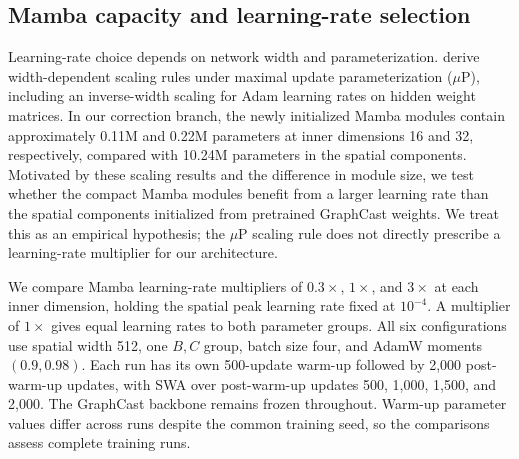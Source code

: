 \documentclass{article}
\begin{document}
\subsection{\texorpdfstring{{Mamba capacity and learning-rate selection}}{Mamba capacity and learning-rate selection}}
\label{sec:training_sensitivity}

{Learning-rate choice depends on network width and parameterization. \citet{yang2022tensorprogramsv} derive width-dependent scaling rules under maximal update parameterization ($\mu$P), including an inverse-width scaling for Adam learning rates on hidden weight matrices. In our correction branch, the newly initialized Mamba modules contain approximately 0.11M and 0.22M parameters at inner dimensions 16 and 32, respectively, compared with 10.24M parameters in the spatial components. Motivated by these scaling results and the difference in module size, we test whether the compact Mamba modules benefit from a larger learning rate than the spatial components initialized from pretrained GraphCast weights. We treat this as an empirical hypothesis; the $\mu$P scaling rule does not directly prescribe a learning-rate multiplier for our architecture.}

{We compare Mamba learning-rate multipliers of $0.3\times$, $1\times$, and $3\times$ at each inner dimension, holding the spatial peak learning rate fixed at $10^{-4}$. A multiplier of $1\times$ gives equal learning rates to both parameter groups. All six configurations use spatial width 512, one $B,C$ group, batch size four, and AdamW moments $(0.9,0.98)$. Each run has its own 500-update warm-up followed by 2,000 post-warm-up updates, with SWA over post-warm-up updates 500, 1,000, 1,500, and 2,000. The GraphCast backbone remains frozen throughout. Warm-up parameter values differ across runs despite the common training seed, so the comparisons assess complete training runs.}
\end{document}

